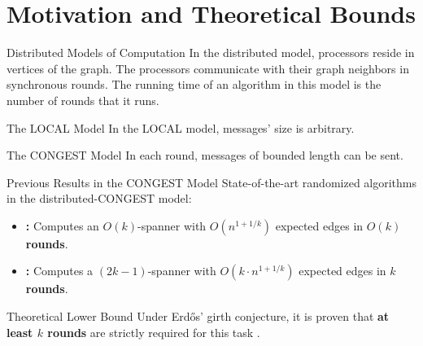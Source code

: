 \documentclass{beamer}
\begin{document}
\section{Motivation and Theoretical Bounds}

\begin{frame}{Distributed Models of Computation}
    In the distributed model, processors reside in vertices of the graph. 
    The processors communicate with their graph neighbors in synchronous rounds.
    The running time of an algorithm in this model is the number of rounds that it runs.
    \vspace{0.4cm}
    \begin{block}{The LOCAL Model}
        In the LOCAL model, messages' size is arbitrary.
    \end{block}
    \begin{block}{The CONGEST Model}
        In each round, messages of bounded length can be sent.
    \end{block}
\end{frame}

\begin{frame}{Previous Results in the CONGEST Model}
    State-of-the-art randomized algorithms in the distributed-CONGEST model:
    \vspace{0.3cm}
    
    \begin{itemize}
        \item \textbf{\cite{MPVX15}:} Computes an $O(k)$-spanner with $O(n^{1+1/k})$ expected edges in \textbf{$O(k)$ rounds}.
        \vspace{0.2cm}
        \item \textbf{\cite{BS07, Elk07a}:} Computes a $(2k - 1)$-spanner with $O(k \cdot n^{1+1/k})$ expected edges in \textbf{$k$ rounds}.
    \end{itemize}
    
    \vspace{0.4cm}
    \begin{alertblock}{Theoretical Lower Bound}
        Under Erdős' girth conjecture, it is proven that \textbf{at least $k$ rounds} are strictly required for this task \cite{Elk07a, DGPV08}.
    \end{alertblock}
\end{frame}
\end{document}

